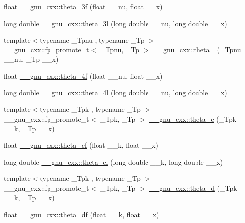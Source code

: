 \begin{DoxyCompactItemize}
\item 
float \hyperlink{group__mathsf__gnu_ga9a7c967d2a456f1a6aceee9a53f024b1}{\+\_\+\+\_\+gnu\+\_\+cxx\+::theta\+\_\+3f} (float \+\_\+\+\_\+nu, float \+\_\+\+\_\+x)
\item 
long double \hyperlink{group__mathsf__gnu_gaf88874ff6c69940d2191f7947d2ea119}{\+\_\+\+\_\+gnu\+\_\+cxx\+::theta\+\_\+3l} (long double \+\_\+\+\_\+nu, long double \+\_\+\+\_\+x)
\item 
{\footnotesize template$<$typename \+\_\+\+Tpnu , typename \+\_\+\+Tp $>$ }\\\+\_\+\+\_\+gnu\+\_\+cxx\+::fp\+\_\+promote\+\_\+t$<$ \+\_\+\+Tpnu, \+\_\+\+Tp $>$ \hyperlink{group__mathsf__gnu_ga8a6f8b69272a9f205a13e1745832ada3}{\+\_\+\+\_\+gnu\+\_\+cxx\+::theta\+\_} (\+\_\+\+Tpnu \+\_\+\+\_\+nu, \+\_\+\+Tp \+\_\+\+\_\+x)
\item 
float \hyperlink{group__mathsf__gnu_ga0c5cbf87e304844ed4c3423be5ca09a5}{\+\_\+\+\_\+gnu\+\_\+cxx\+::theta\+\_\+4f} (float \+\_\+\+\_\+nu, float \+\_\+\+\_\+x)
\item 
long double \hyperlink{group__mathsf__gnu_gaaf63a80e90cdcdd66ebb18cd3a84afae}{\+\_\+\+\_\+gnu\+\_\+cxx\+::theta\+\_\+4l} (long double \+\_\+\+\_\+nu, long double \+\_\+\+\_\+x)
\item 
{\footnotesize template$<$typename \+\_\+\+Tpk , typename \+\_\+\+Tp $>$ }\\\+\_\+\+\_\+gnu\+\_\+cxx\+::fp\+\_\+promote\+\_\+t$<$ \+\_\+\+Tpk, \+\_\+\+Tp $>$ \hyperlink{group__mathsf__gnu_ga3ebbb6513c39e1d55b08cba7d169ce3d}{\+\_\+\+\_\+gnu\+\_\+cxx\+::theta\+\_\+c} (\+\_\+\+Tpk \+\_\+\+\_\+k, \+\_\+\+Tp \+\_\+\+\_\+x)
\item 
float \hyperlink{group__mathsf__gnu_ga409f898afeaad5e25726ad552cfe6946}{\+\_\+\+\_\+gnu\+\_\+cxx\+::theta\+\_\+cf} (float \+\_\+\+\_\+k, float \+\_\+\+\_\+x)
\item 
long double \hyperlink{group__mathsf__gnu_ga0531098c628999cf396217ff997cfdda}{\+\_\+\+\_\+gnu\+\_\+cxx\+::theta\+\_\+cl} (long double \+\_\+\+\_\+k, long double \+\_\+\+\_\+x)
\item 
{\footnotesize template$<$typename \+\_\+\+Tpk , typename \+\_\+\+Tp $>$ }\\\+\_\+\+\_\+gnu\+\_\+cxx\+::fp\+\_\+promote\+\_\+t$<$ \+\_\+\+Tpk, \+\_\+\+Tp $>$ \hyperlink{group__mathsf__gnu_ga258edb995137d9e6344b3cd750266d74}{\+\_\+\+\_\+gnu\+\_\+cxx\+::theta\+\_\+d} (\+\_\+\+Tpk \+\_\+\+\_\+k, \+\_\+\+Tp \+\_\+\+\_\+x)
\item 
float \hyperlink{group__mathsf__gnu_gad2dc6fcaf54d25cbfaad082623941118}{\+\_\+\+\_\+gnu\+\_\+cxx\+::theta\+\_\+df} (float \+\_\+\+\_\+k, float \+\_\+\+\_\+x)

\end{DoxyCompactItemize}
